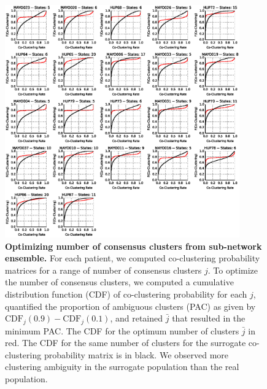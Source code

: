 \begin{figure}[H]
    \includegraphics[width=0.9\textwidth]{patient_stateNMF_cdf_pac.eps}
    \caption[Optimizing number of consensus clusters from sub-network ensemble]{\textbf{Optimizing number of consensus clusters from sub-network ensemble.} For each patient, we computed co-clustering probability matrices for a range of number of consensus clusters $j$. To optimize the number of consensus clusters, we computed a cumulative distribution function (CDF) of co-clustering probability for each $j$, quantified the proportion of ambiguous clusters (PAC) as given by $\text{CDF}_j(0.9)-\text{CDF}_j(0.1)$, and retained $\bar{j}$ that resulted in the minimum PAC. The CDF for the optimum number of clusters $\bar{j}$ in red. The CDF for the same number of clusters for the surrogate co-clustering probability matrix is in black. We observed more clustering ambiguity in the surrogate population than the real population. \label{ch4:figS2}}
\end{figure}

